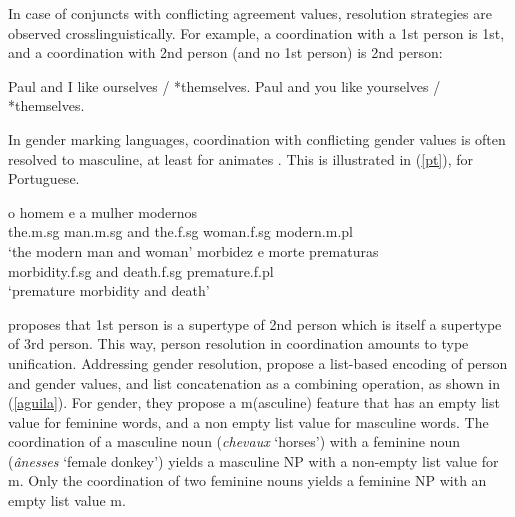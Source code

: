 \documentclass[output=paper]{langsci/langscibook}
\begin{document}
In case of conjuncts with conflicting agreement values, resolution strategies are observed 
crosslinguistically. For example, a coordination with a 1st person is 1st, and a coordination with 2nd person (and no 1st person) is 2nd person:

\begin{exe}
 \ex
\begin{xlista}
\ex Paul and I like ourselves / *themselves.
\ex Paul and you like yourselves / *themselves.
\end{xlista}
\end{exe}

In gender marking languages, coordination with conflicting gender values is often resolved to 
masculine, at least for animates \citep{Corbet91}. This is illustrated in (\ref{pt}), for Portuguese.

\begin{exe}
 \ex
\begin{xlista}
\ex \gll o homem e a mulher modernos \\
the.{\sc m.sg} man.{\sc m.sg} and the.{\sc f.sg} woman.{\sc f.sg} modern.{\sc m.pl} \\
\glt `the modern man and woman'
\ex \gll morbidez e morte prematuras \\
morbidity.{\sc f.sg} and death.{\sc f.sg} premature.{\sc f.pl}\\
\glt `premature morbidity and death'\\
\citep[433]{Villavicencio:Sadler:ea:05}
\end{xlista}\label{pt}
\end{exe}




 \citet{Sag:03} proposes that 1st person is a supertype of 2nd person which is itself a supertype of 3rd person. This way, person resolution in coordination amounts to type unification. Addressing gender resolution, \citet{Aguila:Crysmann:18} propose a list-based encoding of person and gender values, and list concatenation as a combining operation, as shown in (\ref{aguila}). For gender, they propose a {\sc m}({\sc asculine}) feature that has an empty list value for feminine words, and a non empty list value for masculine words.  The coordination of a masculine noun ({\it chevaux} `horses') with a feminine noun ({\it \^{a}nesses} `female donkey')  yields a masculine NP with a non-empty list value for {\sc m}. Only the coordination of two feminine nouns yields a feminine NP with an empty list value {\sc m}.
 
\end{document}
